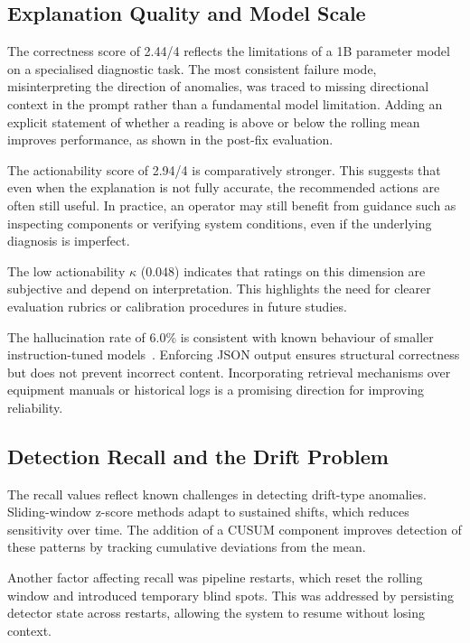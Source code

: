 \documentclass[11pt, a4paper]{article}
\begin{document}
\subsection{Explanation Quality and Model Scale}

The correctness score of 2.44/4 reflects the limitations of a 1B 
parameter model on a specialised diagnostic task. The most consistent 
failure mode, misinterpreting the direction of anomalies, was traced to 
missing directional context in the prompt rather than a fundamental model 
limitation. Adding an explicit statement of whether a reading is above or 
below the rolling mean improves performance, as shown in the post-fix 
evaluation.

The actionability score of 2.94/4 is comparatively stronger. This 
suggests that even when the explanation is not fully accurate, the 
recommended actions are often still useful. In practice, an operator may 
still benefit from guidance such as inspecting components or verifying 
system conditions, even if the underlying diagnosis is imperfect.

The low actionability $\kappa$ (0.048) indicates that ratings on this 
dimension are subjective and depend on interpretation. This highlights 
the need for clearer evaluation rubrics or calibration procedures in 
future studies.

The hallucination rate of 6.0\% is consistent with known behaviour of 
smaller instruction-tuned models~\cite{huang2023survey}. Enforcing JSON 
output ensures structural correctness but does not prevent incorrect 
content. Incorporating retrieval mechanisms over equipment manuals or 
historical logs is a promising direction for improving reliability.

\subsection{Detection Recall and the Drift Problem}

The recall values reflect known challenges in detecting drift-type 
anomalies. Sliding-window z-score methods adapt to sustained shifts, 
which reduces sensitivity over time. The addition of a CUSUM component 
improves detection of these patterns by tracking cumulative deviations 
from the mean.

Another factor affecting recall was pipeline restarts, which reset the 
rolling window and introduced temporary blind spots. This was addressed 
by persisting detector state across restarts, allowing the system to 
resume without losing context.
\end{document}
